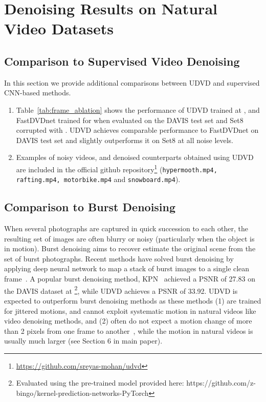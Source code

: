 \documentclass[final]{cvpr}
\begin{document}
\section{Denoising Results on Natural Video Datasets}
\label{sec:denoise_natural}


\subsection{Comparison to Supervised Video Denoising}
In this section we provide additional comparisons between UDVD and supervised CNN-based methods.
\begin{enumerate}
    \item Table~\ref{tab:frame_ablation} shows the performance of UDVD trained at , and FastDVDnet trained for  when evaluated on the DAVIS test set and Set8 corrupted with . UDVD achieves comparable performance to FastDVDnet on DAVIS test set and slightly outperforms it on Set8 at all noise levels.
    
    
    \item Examples of noisy videos, and denoised counterparts obtained using UDVD are included in the official github repository\footnote{\href{https://github.com/sreyas-mohan/udvd}{https://github.com/sreyas-mohan/udvd}} (\texttt{hypermooth.mp4, rafting.mp4, motorbike.mp4} and \texttt{snowboard.mp4}).
\end{enumerate}


\subsection{Comparison to Burst Denoising}
When several photographs are captured in quick succession to each other, the resulting set of images are often blurry or noisy (particularly when the object is in motion). Burst denoising aims to recover estimate the original scene from the set of burst photographs. Recent methods have solved burst denoising by applying deep neural network to map a stack of burst images to a single clean frame~\cite{Godard_2018_ECCV, Mildenhall_2018_CVPR, Xia_2020_CVPR}. A popular burst denoising method, KPN~\cite{Mildenhall_2018_CVPR} achieved a PSNR of 27.83 on the DAVIS dataset at  \footnote{Evaluated using the pre-trained model provided here: https://github.com/z-bingo/kernel-prediction-networks-PyTorch}, while UDVD achieves a PSNR of 33.92. UDVD is expected to outperform burst denoising methods as these methods (1) are trained for jittered motions, and cannot exploit systematic motion in natural videos like video denoising methods, and (2) often do not expect a motion change of more than 2 pixels from one frame to another~\cite{Mildenhall_2018_CVPR}, while the motion in natural videos is usually much larger (see Section 6 in main paper). 
\end{document}
